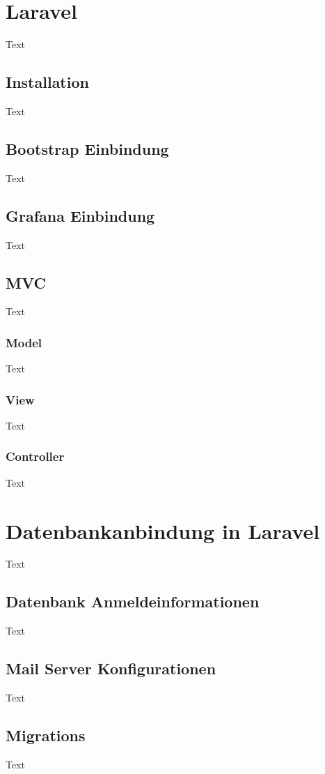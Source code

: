 \section{Laravel }
Text

\subsection{Installation}
Text

\subsection{Bootstrap Einbindung}
Text
\subsection{Grafana Einbindung}
Text

\subsection{MVC}\label{sec:MVC}
Text
\subsubsection{Model}
Text
\subsubsection{View}
Text
\subsubsection{Controller}
Text


\section{Datenbankanbindung in Laravel}
Text

\subsection{Datenbank Anmeldeinformationen}
Text

\subsection{Mail Server Konfigurationen}
Text

\subsection{Migrations}
Text


